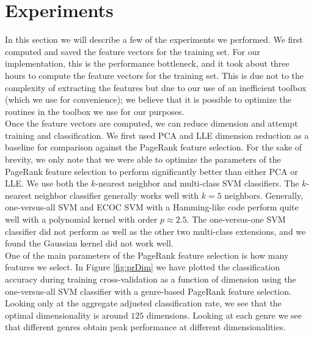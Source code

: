 \documentclass[12pt]{article}
\begin{document}
\section{Experiments}

In this section we will describe a few of the experiments we performed.  We first computed and saved the feature vectors for the training set.  For our implementation, this is the performance bottleneck, and it took about three hours to compute the feature vectors for the training set.  This is due not to the complexity of extracting the features but due to our use of an inefficient toolbox (which we use for convenience); we believe that it is possible to optimize the routines in the toolbox we use for our purposes.\\

Once the feature vectors are computed, we can reduce dimension and attempt training and classification.  We first used PCA and LLE dimension reduction as a baseline for comparison against the PageRank feature selection.  For the sake of brevity, we only note that we were able to optimize the parameters of the PageRank feature selection to perform significantly better than either PCA or LLE.  We use both the $k$-nearest neighbor and multi-class SVM classifiers.  The $k$-nearest neighbor classifier generally works well with $k=5$ neighbors.  Generally, one-versus-all SVM and ECOC SVM with a Hamming-like code perform quite well with a polynomial kernel with order $p\approx 2.5$.  The one-versus-one SVM classifier did not perform as well as the other two multi-class extensions, and we found the Gaussian kernel did not work well.\\

One of the main parameters of the PageRank feature selection is how many features we select.  In Figure \ref{fig:prDim} we have plotted the classification accuracy during training cross-validation as a function of dimension using the one-versus-all SVM classifier with a genre-based PageRank feature selection.  Looking only at the aggregate adjusted classification rate, we see that the optimal dimensionality is around $125$ dimensions.  Looking at each genre we see that different genres obtain peak performance at different dimensionalities.
\end{document}
